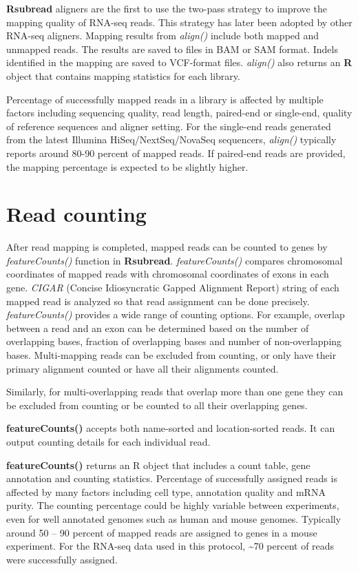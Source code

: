 \documentclass[]{book}
\begin{document}
\textbf{Rsubread} aligners are the first to use the two-pass strategy to improve the mapping quality
of RNA-seq reads. This strategy has later been adopted by other RNA-seq aligners.
Mapping results from \emph{align()} include both mapped and unmapped reads. The results are
saved to files in BAM or SAM format. Indels identified in the mapping are saved to VCF-format
files. \emph{align()} also returns an \textbf{R} object that contains mapping statistics for each library.

Percentage of successfully mapped reads in a library is affected by multiple factors including
sequencing quality, read length, paired-end or single-end, quality of reference sequences and
aligner setting. For the single-end reads generated from the latest Illumina
HiSeq/NextSeq/NovaSeq sequencers, \emph{align()} typically reports around 80-90 percent of mapped
reads. If paired-end reads are provided, the mapping percentage is expected to be slightly higher.

\hypertarget{read-counting}{%
\section{Read counting}\label{read-counting}}

After read mapping is completed, mapped reads can be counted to genes by \emph{featureCounts()}
function in \textbf{Rsubread}. \emph{featureCounts()} compares chromosomal coordinates of mapped reads with chromosomal coordinates of exons in each gene. \emph{CIGAR} (Concise Idiosyncratic Gapped
Alignment Report) string of each mapped read is analyzed so that read assignment can be done
precisely. \emph{featureCounts()} provides a wide range of counting options. For example, overlap
between a read and an exon can be determined based on the number of overlapping bases, fraction
of overlapping bases and number of non-overlapping bases. Multi-mapping reads can be excluded from counting, or only have their primary alignment counted or have all their alignments counted.

Similarly, for multi-overlapping reads that overlap more than one gene they can be excluded from
counting or be counted to all their overlapping genes.

\textbf{featureCounts()} accepts both name-sorted and location-sorted reads. It can output counting
details for each individual read.

\textbf{featureCounts()} returns an R object that includes a count table, gene annotation and counting statistics. Percentage of successfully assigned reads is affected by many factors including cell type, annotation quality and mRNA purity. The counting percentage could be highly variable between experiments, even for well annotated genomes such as human and mouse genomes. Typically around 50 -- 90 percent of mapped reads are assigned to genes in a mouse experiment. For the RNA-seq data used in this protocol, \textasciitilde{}70 percent of reads were successfully assigned.
\end{document}
